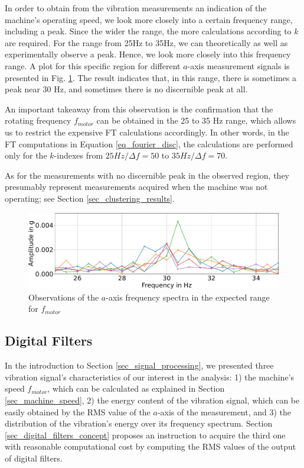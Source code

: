 \documentclass[conference]{IEEEtran}
\begin{document}
In order to obtain from the vibration measurements an indication of the machine's operating speed, we look more closely into a certain frequency range, including a peak. Since the wider the range, the more calculations according to $k$ are required. For the range from 25Hz to 35Hz, we can theoretically as well as experimentally observe a peak. Hence, we look more closely into this frequency range. A plot for this specific region for different $a$-axis measurement signals is presented in Fig. \ref{fig_motor_frequency}. The result indicates that, in this range, there is sometimes a peak near 30 Hz, and sometimes there is no discernible peak at all. 

An important takeaway from this observation is the confirmation that the rotating frequency $f_{motor}$ can be obtained in the 25 to 35 Hz range, which allows us to restrict the expensive FT calculations accordingly. In other words, in the FT computations in Equation \ref{eq_fourier_disc}, the calculations are performed only for the $k$-indexes from $25Hz/\Delta f = 50$ to $35Hz/\Delta f = 70$.

As for the measurements with no discernible peak in the observed region, they presumably represent measurements acquired when the machine was not operating; see Section \ref{sec_clustering_results}.

\begin{figure}[htbp]
\centerline{\includegraphics[width=\columnwidth]{graphics/motor_frequency/motor_frequency.pdf}}
\caption{Observations of the $a$-axis frequency spectra in the expected range for $f_{motor}$}
\label{fig_motor_frequency}
\end{figure}



\subsection{Digital Filters}

In the introduction to Section \ref{sec_signal_processing}, we presented three vibration signal's characteristics of our interest in the analysis: 1) the machine's speed $f_{motor}$, which can be calculated as explained in Section \ref{sec_machine_speed}, 2) the energy content of the vibration signal, which can be easily obtained by the RMS value of the $a$-axis of the measurement, and 3) the distribution of the vibration's energy over its frequency spectrum. Section \ref{sec_digital_filters_concept} proposes an instruction to acquire the third one with reasonable computational cost by computing the RMS values of the output of digital filters.
\end{document}
